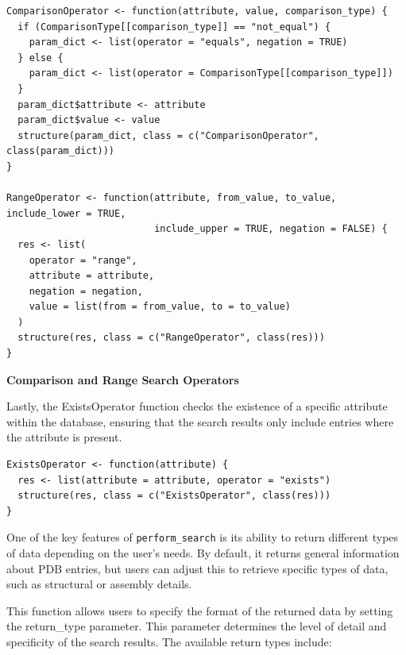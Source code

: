 \begin{verbatim}
ComparisonOperator <- function(attribute, value, comparison_type) {
  if (ComparisonType[[comparison_type]] == "not_equal") {
    param_dict <- list(operator = "equals", negation = TRUE)
  } else {
    param_dict <- list(operator = ComparisonType[[comparison_type]])
  }
  param_dict$attribute <- attribute
  param_dict$value <- value
  structure(param_dict, class = c("ComparisonOperator", class(param_dict)))
}

RangeOperator <- function(attribute, from_value, to_value, include_lower = TRUE, 
                          include_upper = TRUE, negation = FALSE) {
  res <- list(
    operator = "range",
    attribute = attribute,
    negation = negation,
    value = list(from = from_value, to = to_value)
  )
  structure(res, class = c("RangeOperator", class(res)))
}
\end{verbatim}

\textbf{Comparison and Range Search Operators}

Lastly, the ExistsOperator function checks the existence of a specific attribute within the database, ensuring that the search results only include entries where the attribute is present.

\begin{verbatim}
ExistsOperator <- function(attribute) {
  res <- list(attribute = attribute, operator = "exists")
  structure(res, class = c("ExistsOperator", class(res)))
}
\end{verbatim}

One of the key features of \texttt{perform\_search} is its ability to return different types of data depending on the user's needs. By default, it returns general information about PDB entries, but users can adjust this to retrieve specific types of data, such as structural or assembly details.

This function allows users to specify the format of the returned data by setting the return\_type parameter. This parameter determines the level of detail and specificity of the search results. The available return types include:

